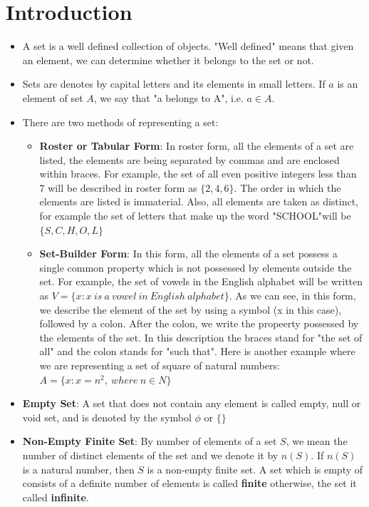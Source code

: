 \documentclass{book}
\begin{document}
	 \section{Introduction}
	 \begin{itemize}
		\item A set is a well defined collection of objects. "Well defined" means that given an element, we can determine whether it belongs to the set or not.
		\item Sets are denotes by capital letters and its elements in small letters. If $a$ is an element of set $A$, we say that "a belongs to A", i.e. $a \in A$.
		\item There are two methods of representing a set:
		\begin{itemize}
			\item \textbf{Roster or Tabular Form}: In roster form, all the elements of a set are listed, the elements are being separated by commas and are enclosed within braces. For example, the set of all even positive integers less than 7 will be described in roster form as ${\{2,4,6\}}$. The order in which the elements are listed is immaterial. Also, all elements are taken as distinct, for example the set of letters that make up the word "SCHOOL"will be $\{S,C,H,O,L\}$
			\item \textbf{Set-Builder Form}: In this form, all the elements of a set possess a single common property which is not possessed by elements outside the set. For example, the set of vowels in the English alphabet will be written as $V = \{x: x \: is \: a \: vowel \: in\: English \: alphabet\}$. As we can see, in this form, we describe the element of the set by using a symbol (x in this case), followed by a colon. After the colon, we write the propeerty possessed by the elements of the set. In this description the braces stand for "the set of all" and the colon stands for "such that". Here is another example where we are representing a set of square of natural numbers: $A = \{x: x = n^2, \: where \: n \in N \}$
		\end{itemize}
		\item \textbf{Empty Set}: A set that does not contain any element is called empty, null or void set, and is denoted by the symbol $\phi$ or $\{\}$
		\item \textbf{Non-Empty Finite Set}: By number of elements of a set $S$, we mean the number of distinct elements of the set and we denote it by $n(S)$. If $n(S)$ is a natural number, then $S$ is a non-empty finite set. A set which is empty of consists of a definite number of elements is called \textbf{finite} otherwise, the set it called \textbf{infinite}.

\end{itemize}
\end{document}
